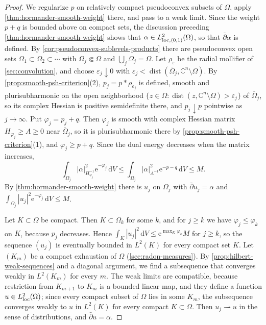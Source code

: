 \begin{proof}
We regularize $p$ on relatively compact pseudoconvex subsets of $\Omega$, apply \cref{thm:hormander-smooth-weight} there, and pass to a weak limit. Since the weight $p+q$ is bounded above on compact sets, the discussion preceding \cref{thm:hormander-smooth-weight} shows that $\alpha\in L^2_{\mathrm{loc},(0,1)}(\Omega)$, so that $\bar\partial\alpha$ is defined. By \cref{cor:pseudoconvex-sublevels-products} there are pseudoconvex open sets $\Omega_1\subset\Omega_2\subset\cdots$ with $\Omega_j\Subset\Omega$ and $\bigcup_j\Omega_j=\Omega$. Let $\rho_\varepsilon$ be the radial mollifier of \cref{sec:convolution}, and choose $\varepsilon_j\downarrow0$ with $\varepsilon_j<\operatorname{dist}(\overline\Omega_j,\mathbb C^n\setminus\Omega)$. By \cref{prop:smooth-psh-criterion}(2), $p_j=p*\rho_{\varepsilon_j}$ is defined, smooth and plurisubharmonic on the open neighborhood $\{z\in\Omega:\operatorname{dist}(z,\mathbb C^n\setminus\Omega)>\varepsilon_j\}$ of $\overline\Omega_j$, so its complex Hessian is positive semidefinite there, and $p_j\downarrow p$ pointwise as $j\to\infty$. Put $\varphi_j=p_j+q$. Then $\varphi_j$ is smooth with complex Hessian matrix $H_{\varphi_j}\ge A\ge0$ near $\overline\Omega_j$, so it is plurisubharmonic there by \cref{prop:smooth-psh-criterion}(1), and $\varphi_j\ge p+q$. Since the dual energy decreases when the matrix increases,
\[
 \int_{\Omega_j}|\alpha|_{H_{\varphi_j}^{-1}}^2\mathrm e^{-\varphi_j}\,\mathrm dV
 \le\int_{\Omega_j}|\alpha|_{A^{-1}}^2\mathrm e^{-p-q}\,\mathrm dV\le M.
\]
By \cref{thm:hormander-smooth-weight} there is $u_j$ on $\Omega_j$ with $\bar\partial u_j=\alpha$ and $\int_{\Omega_j}|u_j|^2\mathrm e^{-\varphi_j}\,\mathrm dV\le M$.

Let $K\subset\Omega$ be compact. Then $K\subset\Omega_k$ for some $k$, and for $j\ge k$ we have $\varphi_j\le\varphi_k$ on $K$, because $p_j$ decreases. Hence $\int_K|u_j|^2\,\mathrm dV\le\mathrm e^{\max_K\varphi_k}M$ for $j\ge k$, so the sequence $(u_j)$ is eventually bounded in $L^2(K)$ for every compact set $K$. Let $(K_m)$ be a compact exhaustion of $\Omega$ (\cref{sec:radon-measures}). By \cref{prop:hilbert-weak-sequences} and a diagonal argument, we find a subsequence that converges weakly in $L^2(K_m)$ for every $m$. The weak limits are compatible, because restriction from $K_{m+1}$ to $K_m$ is a bounded linear map, and they define a function $u\in L^2_{\mathrm{loc}}(\Omega)$; since every compact subset of $\Omega$ lies in some $K_m$, the subsequence converges weakly to $u$ in $L^2(K)$ for every compact $K\subset\Omega$. Then $u_j\rightharpoonup u$ in the sense of distributions, and $\bar\partial u=\alpha$.


\end{proof}
